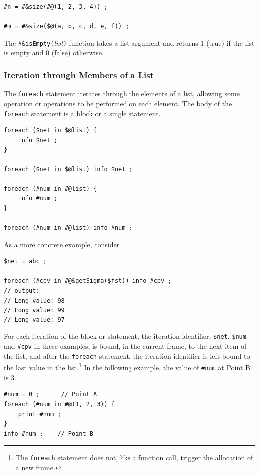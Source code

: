 \documentclass[letterpaper,12pt]{article}
\begin{document}
\begin{Verbatim}[fontsize=\small]
#n = #&size(#@(1, 2, 3, 4)) ;

#m = #&size($@(a, b, c, d, e, f)) ;
\end{Verbatim}

The \verb!#&isEmpty(!\emph{list}\verb!)! function takes a list argument and
returns 1 (true) if the list is empty and 0 (false) otherwise.

\subsubsection{Iteration through Members of a List}


The \texttt{foreach} statement iterates through the elements of a list, allowing
some operation or operations to be performed on each element.  The body of
the \texttt{foreach} statement is a block or a single statement.

\begin{Verbatim}[fontsize=\small]
foreach ($net in $@list) {
    info $net ;
}

foreach ($net in $@list) info $net ;

foreach (#num in #@list) {
    info #num ;
}

foreach (#num in #@list) info #num ;
\end{Verbatim}

\noindent
As a more concrete example, consider

\begin{Verbatim}[fontsize=\small]
$net = abc ;

foreach (#cpv in #@&getSigma($fst)) info #cpv ;
// output:
// Long value: 98
// Long value: 99
// Long value: 97
\end{Verbatim}

For each iteration of the block or statement, the iteration identifier,
\verb!$net!, \verb!$num! and \verb!#cpv! in these examples, is bound, in
the current frame, to the next item of the list, and after the
\texttt{foreach} statement, the iteration identifier is left bound to the
last value in the list.\footnote{The \texttt{foreach} statement does not,
like a function call, trigger the allocation of a new frame.}  In the
following example, the value of \verb!#num! at Point B is 3.

\begin{Verbatim}[fontsize=\small]
#num = 0 ;      // Point A
foreach (#num in #@(1, 2, 3)) {
	print #num ;
}
info #num ;    // Point B
\end{Verbatim}
\end{document}
